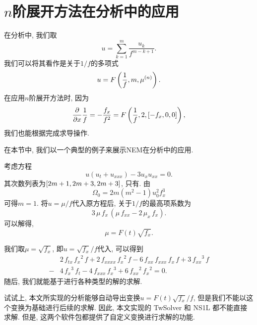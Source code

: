 \section{$n$阶展开方法在\Painleve{}分析中的应用}
在\Painleve{}分析中, 我们取
\begin{equation}
    u=\sum_{k=1}^{m}\frac{u_k}{f^{m-k+1}}.
\end{equation}
我们可以将其看作是关于$1/f$的多项式
\begin{equation}
    u=F\left(\frac{1}{f},m,\mu^{(n)}\right).
\end{equation}
在应用$n$阶展开方法时, 因为 
\begin{equation}
    \frac{\partial}{\partial x}{\frac{1}{f}}=-\frac{f_x}{f^2}=F\left(\frac{1}{f},2,\left[-f_x,0,0\right]\right),
\end{equation}
我们也能根据完成求导操作. 

在本节中, 我们以一个典型的例子来展示NEM在\Painleve{}分析中的应用.

\begin{example}
考虑方程
\begin{equation}
    u(u_t+u_{xxx})-3u_x u_{xx}=0. \label{pseq}
\end{equation}
其次数列表为$\left[2m+1,2m+3,2m+3\right]$, 只有\BPthree{}. 由
\begin{equation}
    \Omega_0=2m(m^2-1)u_0^2f_x^3
\end{equation}
可得$m=1$. 将$u=\mu/f$代入原方程后, 关于$1/f$的最高项系数为
\begin{equation}
    3\,\mu\,{{f}_{x}}\,\left( \mu\,{{f}_{xx}}-2\,{{\mu}_{x}}\,{{f}_{x}}\right) .
\end{equation}
可以解得, 
\begin{equation}
    \mu=F(t)\sqrt{f_x}.
\end{equation}
\end{example}
我们取$\mu=\sqrt{f_x}$, 即$u=\sqrt{f_x}/f$代入, 可以得到
\begin{equation}
\begin{split}
& 2\,{{f}_{tx}}\,{{{f}_{x}}}^{2}\,f+2\,{{f}_{xxxx}}\,{{{f}_{x}}}^{2}\,f-6\,{{f}_{xx}}\,{{f}_{xxx}}\,{{f}_{x}}\,f+3\,{{{f}_{xx}}}^{3}\,f \\
-&4\,{{{f}_{x}}}^{3}\,{{f}_{t}}-4\,{{f}_{xxx}}\,{{{f}_{x}}}^{3}+6\,{{{f}_{xx}}}^{2}\,{{{f}_{x}}}^{2}=0.
\end{split} \label{pseq-f}
\end{equation}
随后, 我们就能基于进行各种类型的解的求解.

试试上, 本文所实现的\Painleve{}分析能够自动导出变换$u=F(t)\sqrt{f_x}/f$, 但是我们不能以这个变换为基础进行后续的求解.  因此, 本文实现的 TwSolver 和 NS1L 都不能直接求解. 但是, 这两个软件包都提供了自定义变换进行求解的功能.

